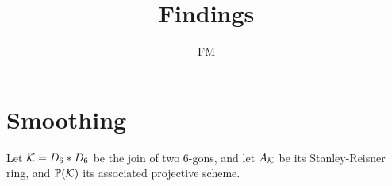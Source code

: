 \documentclass[11pt, english]{article}
\title{Findings}
\author{FM}
\date{}
\begin{document}
\maketitle
\section{Smoothing}

Let $\mathcal K=D_6 \ast D_6$ be the join of two $6$-gons, and let $A_\mathcal K$ be its Stanley-Reisner ring, and $\mathbb{P}(\mathcal K)$ its associated projective scheme. 

\end{document}

